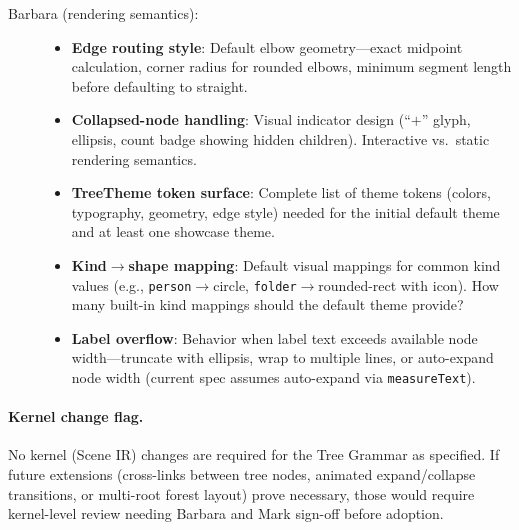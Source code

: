 \begin{description}
  \item[Barbara (rendering semantics):]
  \begin{itemize}
    \item \textbf{Edge routing style}: Default elbow geometry---exact midpoint calculation, corner radius for rounded elbows, minimum segment length before defaulting to straight.
    \item \textbf{Collapsed-node handling}: Visual indicator design (``$+$'' glyph, ellipsis, count badge showing hidden children). Interactive vs.\ static rendering semantics.
    \item \textbf{TreeTheme token surface}: Complete list of theme tokens (colors, typography, geometry, edge style) needed for the initial default theme and at least one showcase theme.
    \item \textbf{Kind$\rightarrow$shape mapping}: Default visual mappings for common kind values (e.g., \texttt{person}$\rightarrow$circle, \texttt{folder}$\rightarrow$rounded-rect with icon). How many built-in kind mappings should the default theme provide?
    \item \textbf{Label overflow}: Behavior when label text exceeds available node width---truncate with ellipsis, wrap to multiple lines, or auto-expand node width (current spec assumes auto-expand via \texttt{measureText}).
  \end{itemize}
\end{description}

\paragraph{Kernel change flag.}
No kernel (Scene IR) changes are required for the Tree Grammar as specified. If future extensions (cross-links between tree nodes, animated expand/collapse transitions, or multi-root forest layout) prove necessary, those would require kernel-level review needing Barbara and Mark sign-off before adoption.
